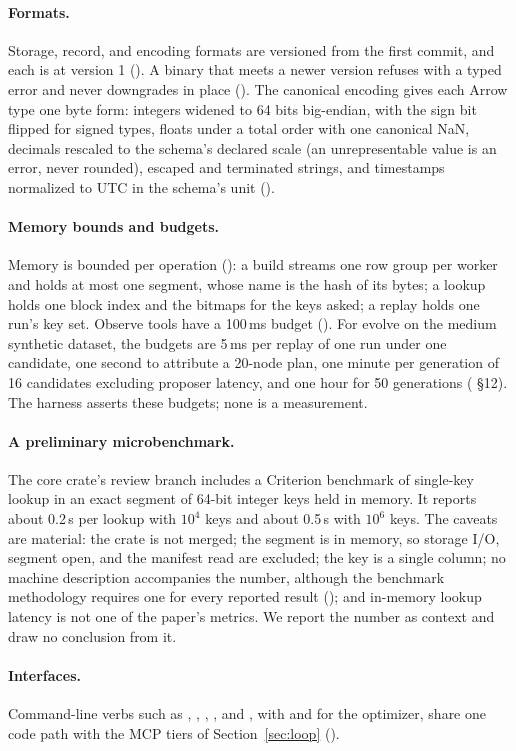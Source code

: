 \paragraph{Formats.} Storage, record, and encoding formats are versioned from
the first commit, and each is at version 1 (). A binary that
meets a newer version refuses with a typed error and never downgrades in place
(). The canonical encoding gives each Arrow type one byte form:
integers widened to 64 bits big-endian, with the sign bit flipped for signed
types, floats under a total order with one canonical NaN, decimals rescaled to the schema's declared scale
(an unrepresentable value is an error, never rounded), escaped and terminated
strings, and timestamps normalized to UTC in the schema's unit ().

\paragraph{Memory bounds and budgets.} Memory is bounded per operation
(): a build streams one row group per worker and holds at most one
segment, whose name is the hash of its bytes; a lookup holds one block index and
the bitmaps for the keys asked; a replay holds one run's key set. Observe tools
have a 100\,ms budget (). For evolve on the medium
synthetic dataset, the budgets are 5\,ms per replay of one run under one
candidate, one second to attribute a 20-node plan, one minute per generation of
16 candidates excluding proposer latency, and one hour for 50 generations
( \S12). The harness asserts these budgets; none is a
measurement.

\paragraph{A preliminary microbenchmark.} The core crate's review branch
includes a Criterion benchmark of single-key lookup in an exact segment of
64-bit integer keys held in memory. It reports about 0.2\,\textmu s per lookup
with $10^4$ keys and about 0.5\,\textmu s with $10^6$ keys. The caveats are
material: the crate is not merged; the segment is in memory, so storage I/O,
segment open, and the manifest read are excluded; the key is a single column; no
machine description accompanies the number, although the benchmark methodology
requires one for every reported result (); and in-memory
lookup latency is not one of the paper's metrics. We report the number as
context and draw no conclusion from it.

\paragraph{Interfaces.} Command-line verbs such as , ,
, , and , with  and
 for the optimizer, share one code path with the MCP tiers of
Section~\ref{sec:loop} ().
